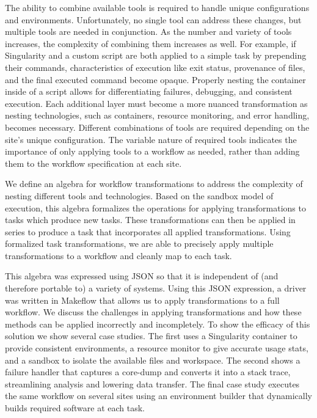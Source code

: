 \documentclass[conference]{IEEEtran}
\begin{document}
The ability to combine available tools is required
to handle unique configurations and environments.
Unfortunately, 
no single tool can address these changes, 
but multiple tools are needed in conjunction.
As the number and variety of tools increases, 
the complexity of combining them increases as well.
For example, if 
Singularity and a custom script
are both applied to a simple task by prepending their
commands, characteristics of execution like
exit status, provenance of files, and
the final executed command become opaque.
Properly nesting the container inside of a
script allows for differentiating failures, 
debugging, and consistent execution.
Each additional layer must become a more nuanced transformation
as nesting technologies, 
such as containers,
resource monitoring, 
and error handling,
becomes necessary.
Different combinations of tools are required
depending on the site's unique configuration.
The variable nature of required tools indicates
the importance of only applying tools to a workflow as needed, 
rather than adding them to the workflow specification at each site.

We define an algebra for workflow transformations
to address the complexity of
nesting different tools and technologies.
Based on the sandbox model of execution, 
this algebra formalizes the operations
for applying transformations to tasks
which produce new tasks.
These transformations can then be applied
in series to produce a task that incorporates
all applied transformations.
Using formalized task transformations,
we are able to precisely apply multiple transformations to a workflow 
and cleanly map to each task.

This algebra was expressed using JSON 
so that it is independent of
(and therefore portable to)
a variety of systems. 
Using this JSON expression, a driver was written
in Makeflow\cite{makeflow-sweet12} that allows us to apply transformations 
to a full workflow.
We discuss the challenges 
in applying transformations and 
how these methods can
be applied incorrectly and incompletely. 
To show the efficacy of this solution
we show several case studies. 
The first uses a Singularity container 
to provide consistent environments, 
a resource monitor to give accurate usage stats, and
a sandbox to isolate the available files and workspace.
The second shows a failure handler that captures a
core-dump and converts it into a stack trace, 
streamlining analysis and lowering data transfer.
The final case study executes the same workflow on
several sites using an environment builder 
that dynamically builds required software at each task. 
\end{document}
